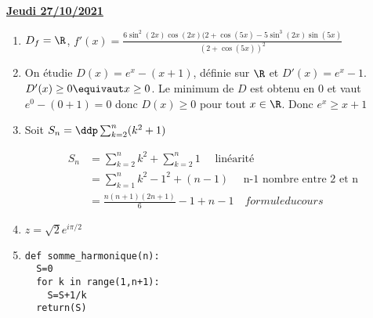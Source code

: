 \documentclass[a4paper, 11pt,reqno]{article}
\newcommand{\jour}[1]{
\begin{center}
\underline{\textbf{#1}}
\end{center}

 }
\begin{document}
\jour{Jeudi 27/10/2021}
\begin{correction}
\begin{enumerate}
\item $D_f= \R$, $f'(x) =\frac{6\sin^2(2x)\cos(2x) (2+\cos(5x) - 5\sin^3(2x)\sin(5x)}{(2+\cos(5x))^2}$
\item On étudie $D(x) = e^x-(x+1)$, définie sur $\R$ et $D'(x) = e^x-1$. 
$D'(x) \geq 0 \equivaut x\geq 0$. Le minimum de $D$ est obtenu en $0$ et vaut $e^0-(0+1)=0$ donc 
$D(x)\geq 0$ pour tout $x\in \R$. Donc $e^x \geq x+1$
\item Soit $S_n =\ddp  \sum_{k=2}^n (k^2+1)$

\begin{align*}
S_n& =\sum_{k=2}^n k^2+\sum_{k=2}^n 1 \quad \text{ linéarité}\\
	&=\sum_{k=1}^n k^2- 1^2 + (n-1)  \quad \text{ n-1 nombre entre 2 et n}\\
	&=\frac{n(n+1)(2n+1)}{6} -1  +n-1\quad { formule du cours}
\end{align*}


\item $z= \sqrt{2} e^{i\pi/2}$
\item 
\begin{lstlisting}
def somme_harmonique(n):
  S=0
  for k in range(1,n+1):
    S=S+1/k
  return(S)
\end{lstlisting}
\end{enumerate}
\end{correction} 
\end{document}
